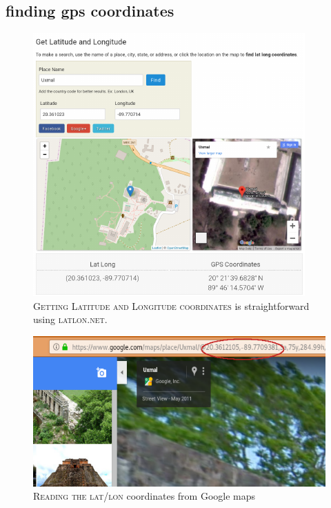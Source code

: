 \subsection{finding gps coordinates}
  \label{sec:coordinates}%
\begin{figure}[h]                                                           
 \includegraphics[width=\linewidth]{./media/images/lat_lon.pdf}%
  \scriptsize{\textsc{\\Getting Latitude and Longitude coordinates} is
    straight\textendash forward using \textsc{latlon.net}.}
  \label{fig:lat_lon}%
\end{figure}
\begin{figure}[h]                                                           
 \includegraphics[width=\linewidth]{./media/images/url.pdf}%
  \scriptsize{\textsc{\\Reading the lat/lon} coordinates from Google maps}
  \label{fig:facade}%
\end{figure}
